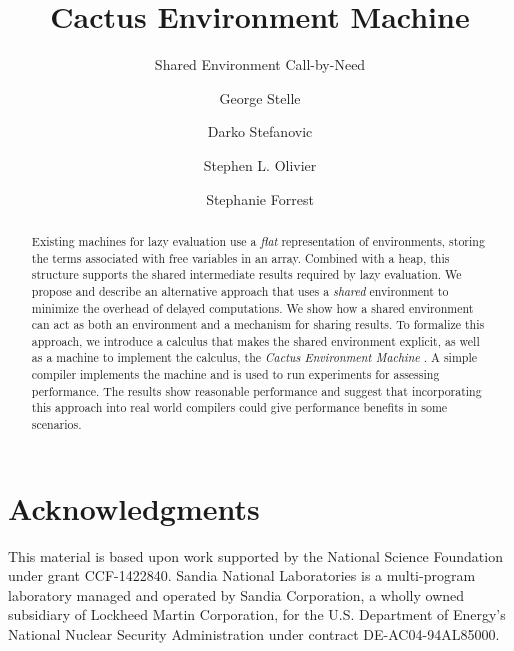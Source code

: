 \documentclass{llncs}
\begin{document}
\title{Cactus Environment Machine}
\subtitle{Shared Environment Call-by-Need}

\author{George Stelle \and Darko Stefanovic 
        \and Stephen L. Olivier 
        \and Stephanie Forrest
        }
      

\maketitle

\begin{abstract}
Existing machines for lazy evaluation use a \emph{flat} representation of
environments, storing the terms associated with free variables in an array.
Combined with a heap, this structure supports the shared intermediate results
required by lazy evaluation.  We propose and describe an alternative
approach that uses a \emph{shared} environment to minimize the overhead of
delayed computations. We show how a shared environment can act as both an
environment and a mechanism for sharing results. To formalize this approach, we
introduce a calculus that makes the shared environment explicit, as well as
a machine to implement the calculus, the \emph{Cactus Environment Machine}
. A simple compiler implements the machine and is used to run experiments for
assessing performance. The results show reasonable performance and suggest that
incorporating this approach into real world compilers could give performance
benefits in some scenarios.
\end{abstract}












\section{Acknowledgments}
This material is based upon work supported by the National Science Foundation
under grant CCF-1422840.  Sandia National Laboratories is a multi-program
laboratory managed and operated by Sandia Corporation, a wholly owned subsidiary
of Lockheed Martin Corporation, for the U.S. Department of Energy’s National
Nuclear Security Administration under contract DE-AC04-94AL85000.



% 
\end{document}
